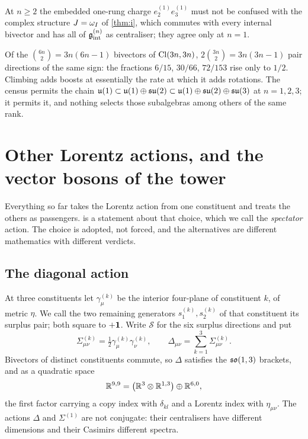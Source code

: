 At $n\ge2$ the embedded one-rung charge $e^{(1)}_2e^{(1)}_3$ must not be confused with the complex structure $J=\omega_I$ of
\cref{thm:i}, which commutes with every internal bivector and has all of $\mathfrak g_{\rm int}^{(n)}$ as centraliser; they agree only at $n=1$.

\begin{remark}
Of the $\binom{6n}2=3n(6n-1)$ bivectors of $\mathrm{Cl}(3n,3n)$, $2\binom{3n}2=3n(3n-1)$ pair directions of the same sign: the fractions
$6/15$, $30/66$, $72/153$ rise only to $1/2$. Climbing adds boosts at essentially the rate at which it adds rotations. The census
permits the chain $\mathfrak{u}(1)\subset\mathfrak{u}(1)\oplus\mathfrak{su}(2)\subset\mathfrak{u}(1)\oplus\mathfrak{su}(2)\oplus\mathfrak{su}(3)$ at $n=1,2,3$; it permits it, and nothing selects those
subalgebras among others of the same rank.
\end{remark}



\section{Other Lorentz actions, and the vector bosons of the tower}
\label{sec:actions}

Everything so far takes the Lorentz action from one constituent and treats the others as passengers.  is a
statement about that choice, which we call the \emph{spectator} action. The choice is adopted, not forced, and the alternatives are
different mathematics with different verdicts.

\subsection{The diagonal action}
\label{sec:diagonal}

At three constituents let $\gamma^{(k)}_\mu$ be the interior four-plane of constituent $k$, of metric $\eta$. We call the two
remaining generators $s^{(k)}_1,s^{(k)}_2$ of that constituent its surplus pair; both square to $+\mathbf 1$. Write $\mathcal S$ for the six surplus
directions and put
\[
\Sigma^{(k)}_{\mu\nu}=\tfrac12\gamma^{(k)}_\mu\gamma^{(k)}_\nu,\qquad \Delta_{\mu\nu}=\sum_{k=1}^3\Sigma^{(k)}_{\mu\nu}.
\]
Bivectors of distinct constituents commute, so $\Delta$ satisfies the $\mathfrak{so}(1,3)$ brackets, and as a quadratic space
\begin{equation}
\label{eq:tensorpic}
\mathbb{R}^{9,9}=\bigl(\mathbb{R}^3\otimes\mathbb{R}^{1,3}\bigr)\oplus\mathbb{R}^{6,0},
\end{equation}
the first factor carrying a copy index with $\delta_{kl}$ and a Lorentz index with $\eta_{\mu\nu}$. The actions $\Delta$ and $\Sigma^{(1)}$ are
not conjugate: their centralisers have different dimensions and their Casimirs different spectra.


